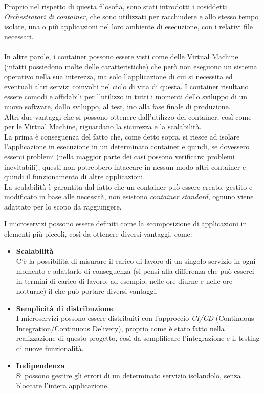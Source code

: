 Proprio nel rispetto di questa filosofia, sono stati introdotti i cosiddetti \emph{Orchestratori di container}, che sono utilizzati per racchiudere e allo stesso tempo 
isolare, una o più applicazioni nel loro ambiente di esecuzione, con i relativi file necessari.\\ \\
In altre parole, i container possono essere visti come delle Virtual Machine (infatti possiedono molte delle caratteristiche) che però non eseguono un sistema operativo 
nella sua interezza, ma solo l'applicazione di cui si necessita ed eventuali altri servizi coinvolti nel ciclo di vita di questa.
I container risultano essere comodi e affidabili per l'utilizzo in tutti i momenti dello sviluppo di un nuovo software, dallo sviluppo, al test, 
ino alla fase finale di produzione.\\ Altri due vantaggi che si possono ottenere dall'utilizzo dei container, così come per le Virtual Machine, 
riguardano la sicurezza e la scalabilità.\\
La prima è conseguenza del fatto che, come detto sopra, si riesce ad isolare l'applicazione in esecuzione in un determinato container e quindi, se dovessero esserci 
problemi (nella maggior parte dei casi possono verificarsi problemi inevitabili), questi non potrebbero intaccare in nessun modo altri container e quindi il funzionamento 
di altre applicazioni.\\
La scalabilità è garantita dal fatto che un container può essere creato, gestito e modificato in base alle necessità, non esistono \emph{container standard}, ognuno 
viene adattato per lo scopo da raggiungere.

I microservizi possono essere definiti come la scomposizione di applicazioni in elementi più piccoli, così da ottenere diversi vantaggi, come:
\begin{itemize}
\item \textbf{Scalabilità}\\ C'è la possibilità di misurare il carico di lavoro di un singolo servizio in ogni momento e adattarlo di conseguenza (si pensi alla differenza 
che può esserci in termini di carico di lavoro, ad esempio, nelle ore diurne e nelle ore notturne) il che può portare diversi vantaggi.
\item \textbf{Semplicità di distribuzione}\\ I microservizi possono essere distribuiti con l'approccio \emph{CI/CD} (Continuous Integration/Continuous Delivery), 
proprio come è stato fatto nella realizzazione di questo progetto, così da semplificare l'integrazione e il testing di nuove funzionalità.
\item \textbf{Indipendenza}\\ Si possono gestire gli errori di un determinato servizio isolandolo, senza bloccare l'intera applicazione.
\end{itemize}

